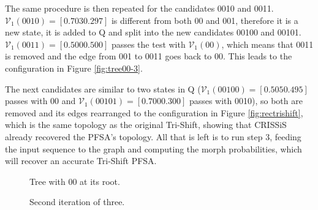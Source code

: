{The same procedure is then repeated for the candidates 0010 and 0011. $\mathcal{V}_1(0010) = [0.703 0.297]$ is different from both 00 and 001, therefore it is a new state, it is added to Q and split into the new candidates 00100 and 00101. $\mathcal{V}_1(0011) = [0.500 0.500]$ passes the test with $\mathcal{V}_1(00)$, which means that 0011 is removed and the edge from 001 to 0011 goes back to 00. This leads to the configuration in Figure \ref{fig:tree00-3}.

The next candidates are similar to two states in Q ($\mathcal{V}_1(00100) = [0.505 0.495]$ passes with 00 and $\mathcal{V}_1(00101) = [0.700 0.300]$ passes with 0010), so both are removed and its edges rearranged to the configuration in Figure \ref{fig:rectrishift}, which is the same topology as the original Tri-Shift, showing that CRISSiS already recovered the PFSA's topology. All that is left is to run step 3, feeding the input sequence to the graph and computing the morph probabilities, which will recover an accurate Tri-Shift PFSA.

\begin{figure}[h]
\centering
{}
\caption{Tree with 00 at its root. \label{fig:tree00}}
\end{figure}

\begin{figure}
\centering
{}
\caption{Second iteration of three.\label{fig:tree00-2}}
\end{figure}

}
